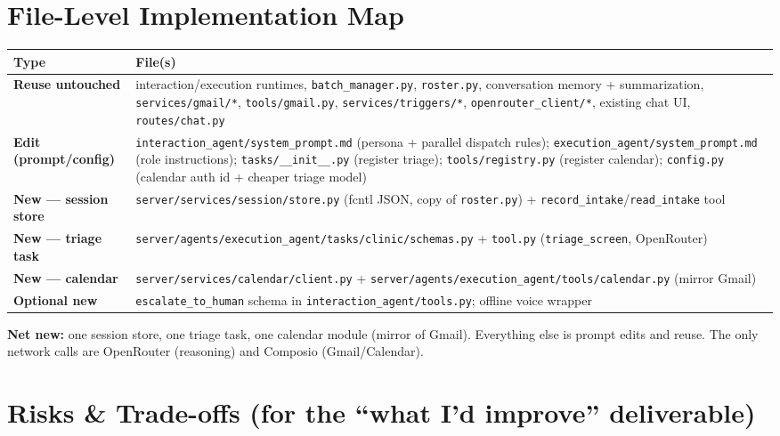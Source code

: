 \documentclass[11pt,a4paper]{article}
\begin{document}
\section{File-Level Implementation Map}

\begin{center}
\begin{longtable}{@{}p{3.0cm}p{9.5cm}@{}}
\toprule
\textbf{Type} & \textbf{File(s)} \\
\midrule
\endhead
\textbf{Reuse untouched} & interaction/execution runtimes, \texttt{batch\_manager.py}, \texttt{roster.py}, conversation memory + summarization, \texttt{services/gmail/*}, \texttt{tools/gmail.py}, \texttt{services/triggers/*}, \texttt{openrouter\_client/*}, existing chat UI, \texttt{routes/chat.py} \\
\textbf{Edit (prompt/config)} & \texttt{interaction\_agent/system\_prompt.md} (persona + parallel dispatch rules); \texttt{execution\_agent/system\_prompt.md} (role instructions); \texttt{tasks/\_\_init\_\_.py} (register triage); \texttt{tools/registry.py} (register calendar); \texttt{config.py} (calendar auth id + cheaper triage model) \\
\textbf{New --- session store} & \texttt{server/services/session/store.py} (fcntl JSON, copy of \texttt{roster.py}) + \texttt{record\_intake}/\texttt{read\_intake} tool \\
\textbf{New --- triage task} & \texttt{server/agents/execution\_agent/tasks/clinic/schemas.py} + \texttt{tool.py} (\texttt{triage\_screen}, OpenRouter) \\
\textbf{New --- calendar} & \texttt{server/services/calendar/client.py} + \texttt{server/agents/execution\_agent/tools/calendar.py} (mirror Gmail) \\
\textbf{Optional new} & \texttt{escalate\_to\_human} schema in \texttt{interaction\_agent/tools.py}; offline voice wrapper \\
\bottomrule
\end{longtable}
\end{center}

\noindent \textbf{Net new:} one session store, one triage task, one calendar module (mirror of Gmail).
Everything else is prompt edits and reuse. The only network calls are OpenRouter (reasoning) and Composio
(Gmail/Calendar).

\section{Risks \& Trade-offs (for the ``what I'd improve'' deliverable)}
\end{document}
